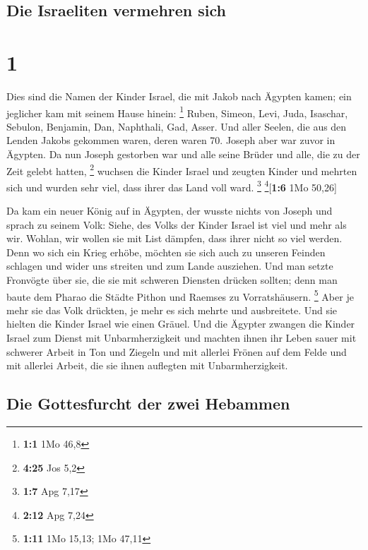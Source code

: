 \hypertarget{die-israeliten-vermehren-sich}{%
\subsection{Die Israeliten vermehren
sich}\label{die-israeliten-vermehren-sich}}

\hypertarget{section}{%
\section{1}\label{section}}

 Dies sind die Namen der Kinder Israel, die mit Jakob nach
Ägypten kamen; ein jeglicher kam mit seinem Hause hinein: \footnote{\textbf{1:1}
  1Mo 46,8}  Ruben, Simeon, Levi, Juda, 
Isaschar, Sebulon, Benjamin,  Dan, Naphthali, Gad, Asser.
 Und aller Seelen, die aus den Lenden Jakobs gekommen
waren, deren waren 70. Joseph aber war zuvor in Ägypten. 
Da nun Joseph gestorben war und alle seine Brüder und alle, die zu der
Zeit gelebt hatten, \footnote{\textbf{4:25} Jos 5,2} 
wuchsen die Kinder Israel und zeugten Kinder und mehrten sich und wurden
sehr viel, dass ihrer das Land voll ward. \footnote{\textbf{1:7} Apg
  7,17} \footnote{\textbf{2:12} Apg 7,24}{[}\textbf{1:6} 1Mo 50,26{]}

 Da kam ein neuer König auf in Ägypten, der wusste nichts
von Joseph  und sprach zu seinem Volk: Siehe, des Volks
der Kinder Israel ist viel und mehr als wir.  Wohlan, wir
wollen sie mit List dämpfen, dass ihrer nicht so viel werden. Denn wo
sich ein Krieg erhöbe, möchten sie sich auch zu unseren Feinden schlagen
und wider uns streiten und zum Lande ausziehen.  Und man
setzte Fronvögte über sie, die sie mit schweren Diensten drücken
sollten; denn man baute dem Pharao die Städte Pithon und Raemses zu
Vorratshäusern. \footnote{\textbf{1:11} 1Mo 15,13; 1Mo 47,11}
 Aber je mehr sie das Volk drückten, je mehr es sich
mehrte und ausbreitete. Und sie hielten die Kinder Israel wie einen
Gräuel.  Und die Ägypter zwangen die Kinder Israel zum
Dienst mit Unbarmherzigkeit  und machten ihnen ihr Leben
sauer mit schwerer Arbeit in Ton und Ziegeln und mit allerlei Frönen auf
dem Felde und mit allerlei Arbeit, die sie ihnen auflegten mit
Unbarmherzigkeit.

\hypertarget{die-gottesfurcht-der-zwei-hebammen}{%
\subsection{Die Gottesfurcht der zwei
Hebammen}\label{die-gottesfurcht-der-zwei-hebammen}}

